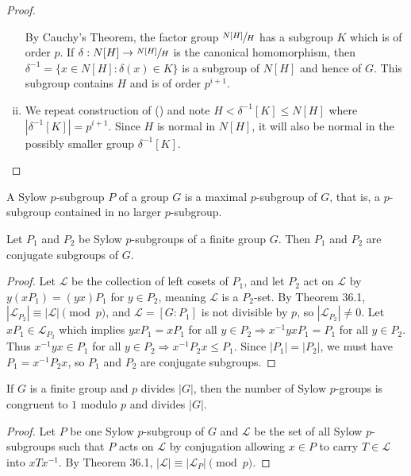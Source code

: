 \documentclass[a4paper,11pt]{article}
\begin{document}
\begin{outline}
\begin{proof}
\begin{enumerate}[i.]
          By Cauchy's Theorem, the factor group \(\sfrac{N[H]}{H}\) has a subgroup \(K\) which is of order \(p\). 
          If \(\delta: N[H] \rightarrow \sfrac{N[H]}{H}\) is the canonical homomorphism, then \(\delta^{-1} =
          \{x \in N[H] : \delta(x) \in K\}\) is a subgroup of \(N[H]\) and hence of \(G\). This subgroup contains 
          \(H\) and is of order \(p^{i+1}\).
        \item 
          We repeat construction of () and note \(H < \delta^{-1}[K] \leq N[H]\) where 
          \(|\delta^{-1}[K]| = p^{i+1}\). Since \(H\) is normal in \(N[H]\), it will also be normal in the 
          possibly smaller group \(\delta^{-1}[K]\).
      \end{enumerate}
    \end{proof}

    A Sylow \(p\)-subgroup \(P\) of a group \(G\) is a maximal \(p\)-subgroup of \(G\), that is, a \(p\)-subgroup 
    contained in no larger \(p\)-subgroup.
    
    Let \(P_1\) and \(P_2\) be Sylow \(p\)-subgroups of a finite group \(G\). Then \(P_1\) and \(P_2\) are 
    conjugate subgroups of \(G\).
    
    \begin{proof}
      Let \(\mathcal{L}\) be the collection of left cosets of \(P_1\), and let \(P_2\) act on \(\mathcal{L}\) by
      \(y(xP_1) = (yx)P_1\) for \(y \in P_2\), meaning \(\mathcal{L}\) is a \(P_2\)-set. By Theorem 36.1, 
      \(|\mathcal{L}_{P_2}| \equiv |\mathcal{L}| \pmod{p}\), and \(\mathcal{L} = [G:P_1]\) is not divisible by \(p\),
      so \(|\mathcal{L}_{P_2}| \neq 0\). Let \(xP_1 \in \mathcal{L}_{P_2}\) which implies \(yxP_1 = xP_1\) for all 
      \(y \in P_2 \Rightarrow x^{-1}yxP_1 = P_1\) for all \(y \in P_2\). Thus \(x^{-1}yx \in P_1\) for all \(y \in P_2
      \Rightarrow x^{-1}P_2x \leq P_1\). Since \(|P_1| = |P_2|\), we must have \(P_1 = x^{-1}P_2x\), so \(P_1\) and
      \(P_2\) are conjugate subgroups.
    \end{proof}

    If \(G\) is a finite group and \(p\) divides \(|G|\), then the number of Sylow \(p\)-groups is congruent 
    to \(1\) modulo \(p\) and divides \(|G|\).
    
    \begin{proof}
      Let \(P\) be one Sylow \(p\)-subgroup of \(G\) and \(\mathcal{L}\) be the set of all Sylow \(p\)-subgroups such
      that \(P\) acts on \(\mathcal{L}\) by conjugation allowing \(x \in P\) to carry \(T \in \mathcal{L}\) into 
      \(xTx^{-1}\). By Theorem 36.1, \(|\mathcal{L}| \equiv |\mathcal{L}_P| \pmod{p}\). 
      

\end{proof}
\end{outline}
\end{document}
